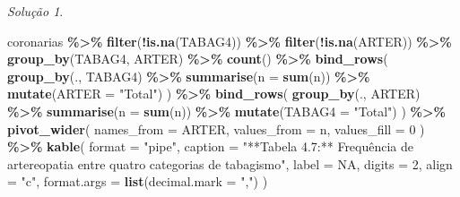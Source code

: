 \documentclass[
]{latex/krantz}
\newenvironment{Shaded}{\begin{snugshade}}{\end{snugshade}}
\newcommand{\AttributeTok}[1]{\textcolor[rgb]{0.13,0.29,0.53}{#1}}
\newcommand{\ConstantTok}[1]{\textcolor[rgb]{0.56,0.35,0.01}{#1}}
\newcommand{\DecValTok}[1]{\textcolor[rgb]{0.00,0.00,0.81}{#1}}
\newcommand{\FunctionTok}[1]{\textcolor[rgb]{0.13,0.29,0.53}{\textbf{#1}}}
\newcommand{\NormalTok}[1]{#1}
\newcommand{\SpecialCharTok}[1]{\textcolor[rgb]{0.81,0.36,0.00}{\textbf{#1}}}
\newcommand{\StringTok}[1]{\textcolor[rgb]{0.31,0.60,0.02}{#1}}
\theoremstyle{definition}
\theoremstyle{definition}
\theoremstyle{definition}
\theoremstyle{definition}
\theoremstyle{remark}
\newtheorem*{solution}{Solução}
\begin{document}
\begin{solution}
\begin{Shaded}
\begin{Highlighting}[]
\NormalTok{coronarias }\SpecialCharTok{\%\textgreater{}\%}
  \FunctionTok{filter}\NormalTok{(}\SpecialCharTok{!}\FunctionTok{is.na}\NormalTok{(TABAG4)) }\SpecialCharTok{\%\textgreater{}\%}
  \FunctionTok{filter}\NormalTok{(}\SpecialCharTok{!}\FunctionTok{is.na}\NormalTok{(ARTER)) }\SpecialCharTok{\%\textgreater{}\%}
  \FunctionTok{group\_by}\NormalTok{(TABAG4, ARTER) }\SpecialCharTok{\%\textgreater{}\%}
  \FunctionTok{count}\NormalTok{() }\SpecialCharTok{\%\textgreater{}\%}
  \FunctionTok{bind\_rows}\NormalTok{(}
    \FunctionTok{group\_by}\NormalTok{(., TABAG4) }\SpecialCharTok{\%\textgreater{}\%}
      \FunctionTok{summarise}\NormalTok{(}\AttributeTok{n =} \FunctionTok{sum}\NormalTok{(n)) }\SpecialCharTok{\%\textgreater{}\%}
      \FunctionTok{mutate}\NormalTok{(}\AttributeTok{ARTER =} \StringTok{"Total"}\NormalTok{)}
\NormalTok{  ) }\SpecialCharTok{\%\textgreater{}\%}
  \FunctionTok{bind\_rows}\NormalTok{(}
    \FunctionTok{group\_by}\NormalTok{(., ARTER) }\SpecialCharTok{\%\textgreater{}\%}
      \FunctionTok{summarise}\NormalTok{(}\AttributeTok{n =} \FunctionTok{sum}\NormalTok{(n)) }\SpecialCharTok{\%\textgreater{}\%}
      \FunctionTok{mutate}\NormalTok{(}\AttributeTok{TABAG4 =} \StringTok{"Total"}\NormalTok{)}
\NormalTok{  ) }\SpecialCharTok{\%\textgreater{}\%}
  \FunctionTok{pivot\_wider}\NormalTok{(}
    \AttributeTok{names\_from =}\NormalTok{ ARTER,}
    \AttributeTok{values\_from =}\NormalTok{ n,}
    \AttributeTok{values\_fill =} \DecValTok{0}
\NormalTok{  ) }\SpecialCharTok{\%\textgreater{}\%}
  \FunctionTok{kable}\NormalTok{(}
    \AttributeTok{format =} \StringTok{"pipe"}\NormalTok{,}
    \AttributeTok{caption =} \StringTok{"**Tabela 4.7:** Frequência de artereopatia entre quatro categorias de tabagismo"}\NormalTok{,}
    \AttributeTok{label =} \ConstantTok{NA}\NormalTok{,}
    \AttributeTok{digits =} \DecValTok{2}\NormalTok{,}
    \AttributeTok{align =} \StringTok{"c"}\NormalTok{,}
    \AttributeTok{format.args =} \FunctionTok{list}\NormalTok{(}\AttributeTok{decimal.mark =} \StringTok{","}\NormalTok{)}
\NormalTok{  )}
\end{Highlighting}
\end{Shaded}


\end{solution}
\end{document}
